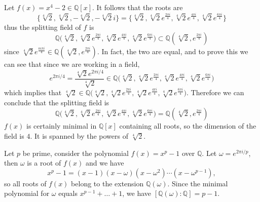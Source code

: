   \begin{example}
    Let $f(x) = x^4 - 2 \in \mathbb{Q}[x]$. It follows that the roots are 
    \begin{equation}
      \{ \sqrt[4]{2}, \sqrt[4]{2}, -\sqrt[4]{2}, - \sqrt[4]{2} i \} = \Big\{ \sqrt[4]{2}, \sqrt[4]{2} e^{\frac{2\pi i}{4}}, \sqrt[4]{2} e^{\frac{4\pi i}{4}}, \sqrt[4]{2} e^{\frac{6\pi i}{4}} \Big\}
    \end{equation}
    thus the splitting field of $f$ is 
    \begin{equation}
      \mathbb{Q} \big( \sqrt[4]{2}, \sqrt[4]{2} e^{\frac{2\pi i}{4}}, \sqrt[4]{2} e^{\frac{4\pi i}{4}}, \sqrt[4]{2} e^{\frac{6\pi i}{4}} \big) \subset \mathbb{Q}(\sqrt[4]{2}, e^{\frac{2\pi i}{4}})
    \end{equation}
    since $\sqrt[4]{2} e^{\frac{m \pi i}{4}} \in \mathbb{Q}(\sqrt[4]{2}, e^{\frac{2\pi i}{4}})$. In fact, the two are equal, and to prove this we can see that since we are working in a field, 
    \begin{equation}
      e^{2 \pi i / 4} = \frac{\sqrt[4]{2} e^{2\pi i/4}}{\sqrt[4]{2}} \in \mathbb{Q} \big( \sqrt[4]{2}, \sqrt[4]{2} e^{\frac{2\pi i}{4}}, \sqrt[4]{2} e^{\frac{4\pi i}{4}}, \sqrt[4]{2} e^{\frac{6\pi i}{4}} \big) 
    \end{equation}
    which implies that $\sqrt[4]{2} \in \mathbb{Q} \big( \sqrt[4]{2}, \sqrt[4]{2} e^{\frac{2\pi i}{4}}, \sqrt[4]{2} e^{\frac{4\pi i}{4}}, \sqrt[4]{2} e^{\frac{6\pi i}{4}} \big)$. Therefore we can conclude that the splitting field is 
    \begin{equation}
      \mathbb{Q} \big( \sqrt[4]{2}, \sqrt[4]{2} e^{\frac{2\pi i}{4}}, \sqrt[4]{2} e^{\frac{4\pi i}{4}}, \sqrt[4]{2} e^{\frac{6\pi i}{4}} \big) = \mathbb{Q}(\sqrt[4]{2}, e^{\frac{2\pi i}{4}})
    \end{equation}
    $f(x)$ is certainly minimal in $\mathbb{Q}[x]$ containing all roots, so the dimension of the field is $4$. It is spanned by the powers of $\sqrt[4]{2}$. 
  \end{example} 

  \begin{example} 
    Let $p$ be prime, consider the polynomial $f(x) = x^p - 1$ over $\mathbb{Q}$. Let $\omega = e^{2\pi i/p}$, then $\omega$ is a root of $f(x)$ and we have
    \begin{equation}
      x^p - 1 = (x - 1)(x - \omega)(x - \omega^2)\cdots(x - \omega^{p-1}),
    \end{equation}
    so all roots of $f(x)$ belong to the extension $\mathbb{Q}(\omega)$. Since the minimal polynomial for $\omega$ equals $x^{p-1} + \ldots + 1$, we have $[\mathbb{Q}(\omega) : \mathbb{Q}] = p - 1$.
  \end{example}

